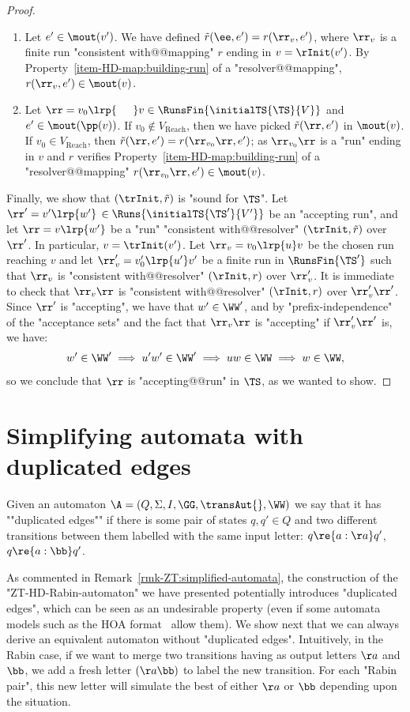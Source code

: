 \documentclass{theoretics}
\begin{document}
\begin{proof}
\begin{enumerate}
		\item Let $e'\in \mout(v')$. We have defined $\tilde{r}(\ee, e') = r(\rr_v, e')$, where $\rr_v$ is a finite run "consistent with@@mapping" $r$ ending in $v=\rInit(v')$. By Property~\ref{item-HD-map:building-run} of a "resolver@@mapping", $r(\rr_v, e') \in \mout(v)$.
		
		\item Let $\rr = v_0 \lrp{\phantom{ww}} v \in \RunsFin{\initialTS{\TS}{V}}$ and $e'\in \mout(\pp(v))$. 
		If $v_0\notin V_{\mathrm{Reach}}$, then we have picked $\tilde{r}(\rr, e')$ in $\mout(v)$.
		If $v_0\in V_{\mathrm{Reach}}$, then $\tilde{r}(\rr, e') = r(\rr_{v_0}\rr, e')$; as $\rr_{v_0}\rr$ is a "run" ending in $v$ and $r$ verifies Property~\ref{item-HD-map:building-run} of a "resolver@@mapping" $r(\rr_{v_0}\rr, e')\in \mout(v)$.
	\end{enumerate} 
	
	Finally, we show that $(\trInit, \tilde{r})$ is "sound for $\TS$". Let  $\rr' = v'\lrp{w'} \,\in \Runs{\initialTS{\TS'}{V'}}$ be an "accepting run",  and let $\rr = v\lrp{w'}$ be a "run" "consistent with@@resolver" $(\trInit, \tilde{r})$ over $\rr'$. In particular, $v = \trInit(v')$. Let $\rr_{v} = v_0\lrp{u}v$ be the chosen run reaching $v$ and let $\rr_{v}' = v_0'\lrp{u'}v'$ be a finite run in $\RunsFin{\TS'}$ such that $\rr_v$ is "consistent with@@resolver" $(\rInit,r)$ over $\rr_{v}'$. It is immediate to check that $\rr_v\rr$ is  "consistent with@@resolver" $(\rInit,r)$ over $\rr_{v}'\rr'$. Since $\rr'$ is "accepting", we have that $w'\in \WW'$, and by "prefix-independence" of the "acceptance sets" and the fact that $\rr_v\rr$ is "accepting" if $\rr_{v}'\rr'$ is, we have:
	\[ w' \in \WW' \implies u'w'\in \WW' \implies uw\in \WW \implies w\in \WW,
	\] 
	so we conclude that $\rr$ is "accepting@@run" in $\TS$, as we wanted to show. 
\end{proof} 	
	\section{Simplifying automata with duplicated edges}
	\label{sec:appendix-simplifications-automata}
	\AP Given an automaton $\A=(Q, \Sigma, I, \GG, \transAut{}, \WW)$ we say that it has ""duplicated edges""  if there is some pair of states $q,q'\in Q$ and two different transitions between them labelled with the same input letter: $q\re{a:\aa}q'$, $q\re{a:\bb}q'$.

As commented in Remark~\ref{rmk-ZT:simplified-automata}, the construction of the "ZT-HD-Rabin-automaton" we have presented potentially introduces "duplicated edges", which can be seen as an undesirable property (even if some automata models such as the HOA format~\cite{HOAFormat2015} allow them). We show next that we can always derive an equivalent automaton without "duplicated edges". Intuitively, in the Rabin case, if we want to merge two transitions having as output letters $\aa$ and $\bb$, we add a fresh letter $(\aa\bb)$ to label the new transition. For each "Rabin pair", this new letter will simulate the best of either $\aa$ or $\bb$ depending upon the situation.
\end{document}
